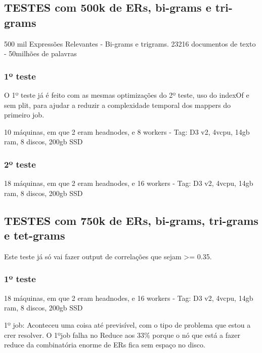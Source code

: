 \subsection{TESTES com 500k de ERs, bi-grams e tri-grams}
500 mil Expressões Relevantes - Bi-grams e trigrams.
23216 documentos de texto - 50milhões de palavras

\subsubsection{1º teste}
O 1º teste já é feito com as mesmas optimizações do 2º teste, uso do indexOf e sem plit, para ajudar a reduzir a complexidade temporal dos mappers do primeiro job.

10 máquinas, em que 2 eram headnodes, e 8 workers - Tag: D3 v2, 4vcpu, 14gb ram, 8 discos, 200gb SSD

\subsubsection{2º teste}
18 máquinas, em que 2 eram headnodes, e 16 workers - Tag: D3 v2, 4vcpu, 14gb ram, 8 discos, 200gb SSD

\subsection{TESTES com 750k de ERs, bi-grams, tri-grams e tet-grams}
Este teste já só vai fazer output de correlações que sejam >= 0.35.

\subsubsection{1º teste}
18 máquinas, em que 2 eram headnodes, e 16 workers - Tag: D3 v2, 4vcpu, 14gb ram, 8 discos, 200gb SSD

1º job: Aconteceu uma coisa até previsível, com o tipo de problema que estou a crer resolver. O 1ºjob falha no Reduce aos 33\% porque o nó que está a fazer reduce da combinatória enorme de ERs fica sem espaço no disco.

